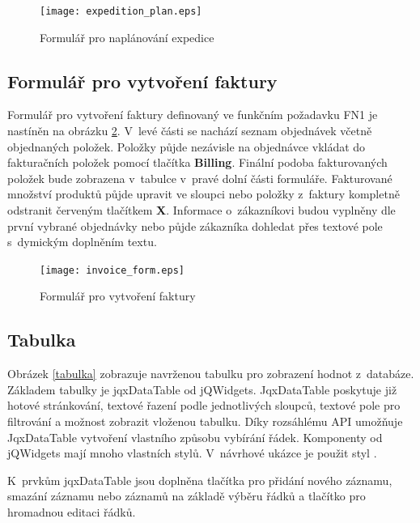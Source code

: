 \documentclass[thesis=B,czech]{FITthesis}[2012/06/26]
\begin{document}
\begin{figure}
	\texttt{[image: expedition\_plan.eps]}
	\caption{Formulář pro naplánování expedice}\label{expedice}
\end{figure}

\subsection{Formulář pro vytvoření faktury}
	Formulář pro vytvoření faktury definovaný ve funkčním požadavku FN1 je nastíněn na obrázku \ref{faktura}. V~levé části se nachází seznam objednávek včetně objednaných položek. Položky půjde nezávisle na objednávce vkládat do fakturačních položek pomocí tlačítka \textbf{Billing}. Finální podoba fakturovaných položek bude zobrazena v~tabulce v~pravé dolní části formuláře. Fakturované množství produktů půjde upravit ve sloupci  nebo položky z~faktury kompletně odstranit červeným tlačítkem \textbf{X}. Informace o~zákazníkovi budou vyplněny dle první vybrané objednávky nebo půjde zákazníka dohledat přes textové pole s~dymickým doplněním textu.

\begin{figure}
	\texttt{[image: invoice\_form.eps]}
	\caption{Formulář pro vytvoření faktury}\label{faktura}
\end{figure}

\subsection{Tabulka}
	Obrázek \ref{tabulka} zobrazuje navrženou tabulku pro zobrazení hodnot z~databáze. Základem tabulky je jqxDataTable\cite{jqx_dataTable} od jQWidgets. JqxDataTable poskytuje již hotové stránkování, textové řazení podle jednotlivých sloupců, textové pole pro filtrování a možnost zobrazit vloženou tabulku. Díky rozsáhlému API umožňuje JqxDataTable vytvoření vlastního způsobu vybírání řádek. Komponenty od jQWidgets mají mnoho vlastních stylů. V~návrhové ukázce je použit styl .
	
	K~prvkům jqxDataTable jsou doplněna tlačítka pro přidání nového záznamu, smazání záznamu nebo záznamů na základě výběru řádků a tlačítko pro hromadnou editaci řádků.
\end{document}

